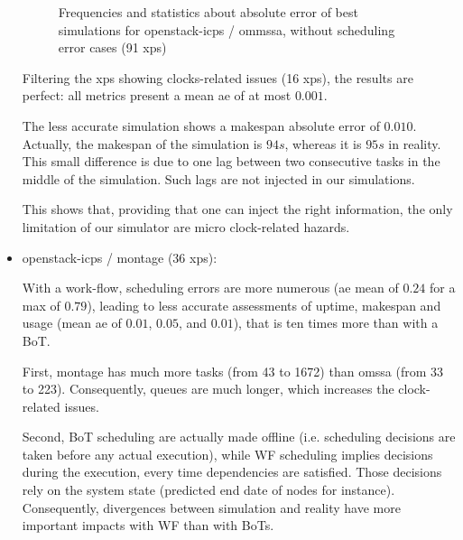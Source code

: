 \documentclass[parallelisme]{compas2017}
\newcommand\vrpath{../../lab/setup/simschlouder/validation-results/}
\begin{document}
\begin{itemize}
\begin{figure}
  
      
  

\caption{Frequencies and statistics about absolute error of best simulations for openstack-icps / 
ommssa, without scheduling error cases (91 xps)}
\end{figure}       

      Filtering the xps showing clocks-related issues (16 xps), the results are perfect:
      all metrics present a mean ae of at most $0.001$.
      
      The less accurate simulation shows a makespan absolute error of $0.010$. 
      Actually, the makespan of the simulation is $94s$, whereas it is $95s$ in reality.
      This small difference is due to one lag between two consecutive tasks 
      in the middle of the simulation. Such lags are not injected in our simulations.
      
      This shows that, providing that one can inject the right information, 
      the only limitation of our simulator are micro clock-related hazards.
      
      
 \item openstack-icps / montage (36 xps): 
 
      

      

      With a work-flow, scheduling errors are more numerous 
      (ae mean of $0.24$ for a max of $0.79$), leading to less accurate assessments
      of uptime, makespan and usage (mean ae of $0.01$, $0.05$, and $0.01$), that
      is ten times more than with a BoT.
      
      First, montage has much more tasks (from 43 to 1672) than omssa (from 33 to 223).
      Consequently, queues are much longer, which increases the clock-related issues.
      
      Second, BoT scheduling are actually made offline (i.e. scheduling decisions are taken
      before any actual execution), while WF scheduling implies decisions during 
      the execution, every time dependencies are satisfied. 
      Those decisions rely on the system state (predicted end date of nodes for 
      instance). Consequently, divergences between simulation and reality have
      more important impacts with WF than with BoTs.
      

\end{itemize}
\end{document}
